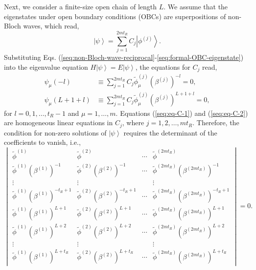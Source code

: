 \documentclass[pdflatex,sn-nature, iicol]{sn-jnl}%
\theoremstyle{thmstyleone}%
\theoremstyle{thmstyletwo}%
\theoremstyle{thmstylethree}%
\begin{document}
Next, we consider a finite-size open chain of length $L$. We assume
that the eigenstates under open boundary conditions (OBCs) are superpositions
of non-Bloch waves, which read, 
\begin{equation}
\left|\psi\right>=\sum_{j=1}^{2mt_{R}}C_{j}\left|\phi^{(j)}\right>.\label{seq:formal-OBC-eigenstate}
\end{equation}
Substituting Eqs. (\ref{seq:non-Bloch-wave-reciprocal}-\ref{seq:formal-OBC-eigenstate})
into the eigenvalue equation $H\left|\psi\right>=E\left|\psi\right>$,
the equations for $C_{j}$ read, 
\begin{align}
\psi_{\mu}\left(-l\right) & \equiv\sum_{j=1}^{2mt_{R}}C_{j}\tilde{\phi}_{\mu}^{(j)}\left(\beta^{(j)}\right)^{-l}=0,\label{seq:eq-C-1}\\
\psi_{\mu}\left(L+1+l\right) & \equiv\sum_{j=1}^{2mt_{R}}C_{j}\tilde{\phi}_{\mu}^{(j)}\left(\beta^{(j)}\right)^{L+1+l}=0,\label{seq:eq-C-2}
\end{align}
for $l=0,1,\dots,t_{R}-1$ and $\mu=1,\dots,m$. Equations (\ref{seq:eq-C-1})
and (\ref{seq:eq-C-2}) are homogeneous linear equations in $C_{j}$,
where $j=1,2,\dots,mt_{R}$. Therefore, the condition for non-zero
solutions of $\left|\psi\right>$ requires the determinant of the
coefficients to vanish, i.e., 
\begin{equation}
\begin{vmatrix}\tilde{\phi}^{(1)} & \tilde{\phi}^{(2)} & \cdots & \tilde{\phi}^{(2mt_{R})}\\
\tilde{\phi}^{(1)}\left(\beta^{(1)}\right)^{-1} & \tilde{\phi}^{(2)}\left(\beta^{(2)}\right)^{-1} & \cdots & \tilde{\phi}^{(2mt_{R})}\left(\beta^{(2mt_{R})}\right)^{-1}\\
\vdots & \vdots &  & \vdots\\
\tilde{\phi}^{(1)}\left(\beta^{(1)}\right)^{-t_{R}+1} & \tilde{\phi}^{(2)}\left(\beta^{(2)}\right)^{-t_{R}+1} & \cdots & \tilde{\phi}^{(2mt_{R})}\left(\beta^{(2mt_{R})}\right)^{-t_{R}+1}\\
\tilde{\phi}^{(1)}\left(\beta^{(1)}\right)^{L+1} & \tilde{\phi}^{(2)}\left(\beta^{(2)}\right)^{L+1} & \cdots & \tilde{\phi}^{(2mt_{R})}\left(\beta^{(2mt_{R})}\right)^{L+1}\\
\tilde{\phi}^{(1)}\left(\beta^{(1)}\right)^{L+2} & \tilde{\phi}^{(2)}\left(\beta^{(2)}\right)^{L+2} & \cdots & \tilde{\phi}^{(2mt_{R})}\left(\beta^{(2mt_{R})}\right)^{L+2}\\
\vdots & \vdots &  & \vdots\\
\tilde{\phi}^{(1)}\left(\beta^{(1)}\right)^{L+t_{R}} & \tilde{\phi}^{(2)}\left(\beta^{(2)}\right)^{L+t_{R}} & \cdots & \tilde{\phi}^{(2mt_{R})}\left(\beta^{(2mt_{R})}\right)^{L+t_{R}}
\end{vmatrix}=0.\label{seq:det-of-C}
\end{equation}
\end{document}

